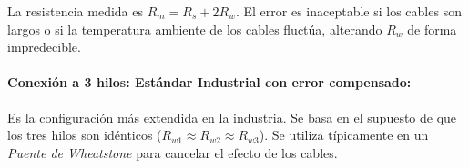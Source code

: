 La resistencia medida es $R_m = R_s + 2R_w$. El error es inaceptable si los cables son largos o si la temperatura ambiente de los cables fluctúa, alterando $R_w$ de forma impredecible.

\paragraph{Conexión a 3 hilos: Estándar Industrial con error compensado:}

Es la configuración más extendida en la industria. Se basa en el supuesto de que los tres hilos son idénticos ($R_{w1} \approx R_{w2} \approx R_{w3}$). Se utiliza típicamente en un \emph{Puente de Wheatstone} para cancelar el efecto de los cables.

\begin{marginfigure}
    \centering
    \shorthandoff{>}
    \caption[Conexión a 3 hilos.]{Conexión a 3 hilos. El hilo de \emph{SENSE} permite al voltímetro medir la tensión justo antes del sensor. Al separar el terminal de medida (\emph{SENSE}), el voltímetro ignora la caída de tensión en el hilo superior. El error sistemático se reduce a la caída de tensión del hilo de retorno, la cual es compensada internamente por el equipo. }\label{fig:conexion_3hilos}
\end{marginfigure}

